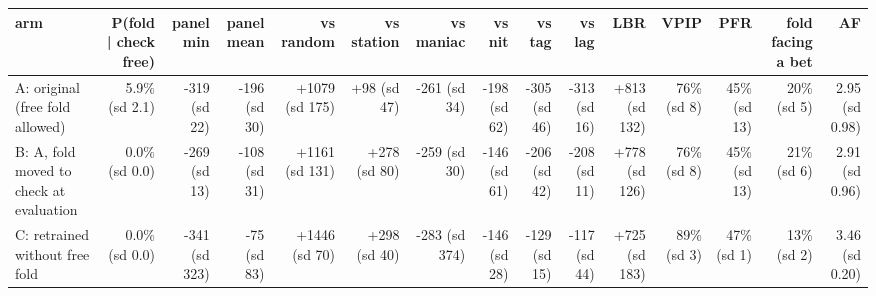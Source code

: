 \begin{tabular}{lrrrrrrrrrrrrrr}
\toprule
arm & P(fold | check free) & panel min & panel mean & vs random & vs station & vs maniac & vs nit & vs tag & vs lag & LBR & VPIP & PFR & fold facing a bet & AF \\
\midrule
A: original (free fold allowed) & 5.9\% (sd 2.1) & -319 (sd 22) & -196 (sd 30) & +1079 (sd 175) & +98 (sd 47) & -261 (sd 34) & -198 (sd 62) & -305 (sd 46) & -313 (sd 16) & +813 (sd 132) & 76\% (sd 8) & 45\% (sd 13) & 20\% (sd 5) & 2.95 (sd 0.98) \\
B: A, fold moved to check at evaluation & 0.0\% (sd 0.0) & -269 (sd 13) & -108 (sd 31) & +1161 (sd 131) & +278 (sd 80) & -259 (sd 30) & -146 (sd 61) & -206 (sd 42) & -208 (sd 11) & +778 (sd 126) & 76\% (sd 8) & 45\% (sd 13) & 21\% (sd 6) & 2.91 (sd 0.96) \\
C: retrained without free fold & 0.0\% (sd 0.0) & -341 (sd 323) & -75 (sd 83) & +1446 (sd 70) & +298 (sd 40) & -283 (sd 374) & -146 (sd 28) & -129 (sd 15) & -117 (sd 44) & +725 (sd 183) & 89\% (sd 3) & 47\% (sd 1) & 13\% (sd 2) & 3.46 (sd 0.20) \\
\bottomrule
\end{tabular}
